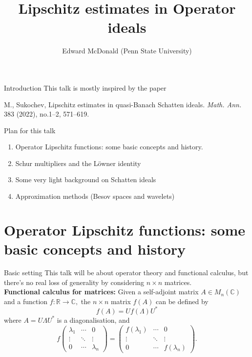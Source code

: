 \documentclass{beamer}
\newcommand\makebeamertitle{\frame{\maketitle}}%
\numberwithin{equation}{section}
\theoremstyle{plain}
\theoremstyle{plain}
\theoremstyle{definition}
\theoremstyle{plain}
\theoremstyle{plain}
\theoremstyle{definition}
\newcommand{\Rl}{\mathbb{R}}
\newcommand{\Cplx}{\mathbb{C}}
\begin{document}
\title[Lipschitz estimates for operators]{Lipschitz estimates in Operator ideals}


\author[E. McDonald]{Edward McDonald (Penn State University)}





\makebeamertitle


\begin{frame}{Introduction}
    This talk is mostly inspired by the paper
    \begin{center}
    M., Sukochev, Lipschitz estimates in quasi-Banach Schatten ideals.
    \emph{Math. Ann.} 383 (2022), no.1--2, 571--619.
    \end{center}
\end{frame}

\begin{frame}{Plan for this talk}
    \begin{enumerate}
        \item{} Operator Lipschitz functions: some basic concepts and history.
        \item{} Schur multipliers and the L\"owner identity
        \item{} Some very light background on Schatten ideals
        \item{} Approximation methods (Besov spaces and wavelets)
    \end{enumerate}
\end{frame}


\section{Operator Lipschitz functions: some basic concepts and history}


\begin{frame}{Basic setting}
    This talk will be about operator theory and functional calculus, but there's no real loss of generality by considering $n\times n$ matrices.
\pause
\\
    \textbf{Functional calculus for matrices:} Given a self-adjoint matrix $A \in M_{n}(\Cplx)$ and a function $f:\Rl\to \Cplx,$ the $n\times n$ matrix $f(A)$ can be defined by
    \[
        f(A) = Uf(\Lambda)U^*
    \]
    where $A = U\Lambda U^*$ is a diagonalisation, and
    \[
        f\begin{pmatrix} \lambda_1 & \cdots & 0 \\
                            \vdots & \ddots & \vdots \\
                             0      & \cdots & \lambda_n
         \end{pmatrix}
         =\begin{pmatrix} f(\lambda_1) & \cdots & 0 \\
                             \vdots      & \ddots & \vdots \\
                             0      & \cdots & f(\lambda_n)
         \end{pmatrix}.
    \]
\end{frame}
\end{document}
